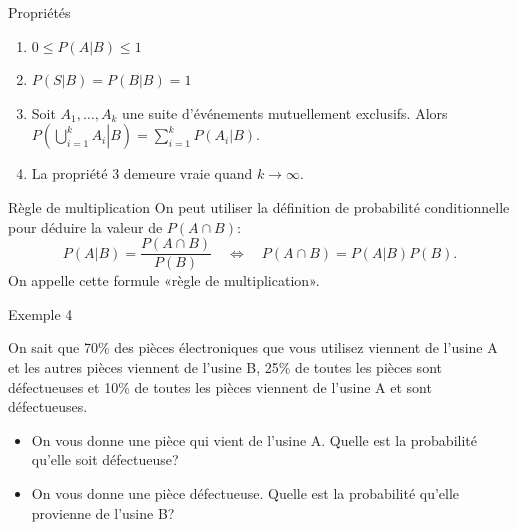 \documentclass{BeamerTemplate}
\begin{document}
\begin{frame}[t]{Propriétés}



 \begin{enumerate}\itemsep3mm
  \item $0\le P(A|B)\le 1$
  \item $P(S|B)=P(B|B)=1$
  \item Soit $A_1,\ldots,A_k$ une suite d'événements \alert{mutuellement
  exclusifs}. Alors $P\left(\left.\bigcup\limits_{i=1}^kA_i\right|B\right)=\sum\limits_{i=1}^k P(A_i|B)$.
  \item La propriété 3 demeure vraie quand $k\to\infty$.
 \end{enumerate}
\end{frame}

\begin{frame}[t]{Règle de multiplication}
On peut utiliser la définition de probabilité conditionnelle pour déduire la valeur de $P(A\cap B)$:
$$P(A|B)=\frac{P(A\cap B)}{P(B)}\quad\Leftrightarrow\quad P(A\cap B)=P(A|B)P(B).$$
On appelle cette formule «règle de multiplication».
\end{frame}
\begin{frame}[t]{Exemple 4}

{\small
On sait que 70\% des pièces électroniques que vous utilisez viennent de l'usine A et les autres pièces viennent de l'usine B, 25\% de toutes les pièces sont défectueuses et 10\% de toutes les pièces viennent de l'usine A et sont défectueuses.

 \begin{itemize}
 \item[a)] On vous donne une  pièce qui vient de l'usine A. Quelle est la probabilité qu'elle soit défectueuse?
 \vspace{1.2cm}
\item[b)] On vous donne une pièce défectueuse. Quelle est la probabilité qu'elle provienne de l'usine B?
    \end{itemize}
     }
\end{frame}

\end{document}
